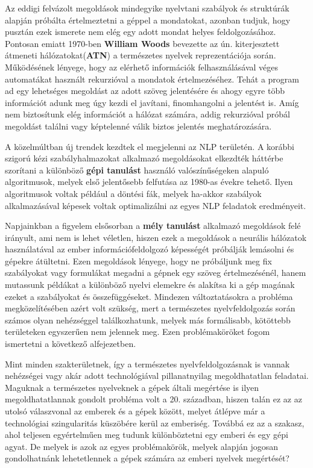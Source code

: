 Az eddigi felvázolt megoldások mindegyike nyelvtani szabályok és struktúrák alapján próbálta értelmeztetni a géppel a mondatokat, azonban tudjuk, hogy pusztán ezek ismerete nem elég egy adott mondat helyes feldolgozásához. Pontosan emiatt 1970-ben \textbf{William Woods} bevezette az ún. kiterjesztett átmeneti hálózatokat(\textbf{ATN}) a természetes nyelvek reprezentációja során. Működésének lényege, hogy az elérhető információk felhasználásával véges automatákat használt rekurzióval a mondatok értelmezéséhez. Tehát a program ad egy lehetséges megoldást az adott szöveg jelentésére és ahogy egyre több információt adunk meg úgy kezdi el javítani, finomhangolni a jelentést is. Amíg nem biztosítunk elég információt a hálózat számára, addig rekurzióval próbál megoldást találni vagy képtelenné válik biztos jelentés meghatározására.

A közelmúltban új trendek kezdtek el megjelenni az NLP területén. A korábbi szigorú kézi szabályhalmazokat alkalmazó megoldásokat elkezdték háttérbe szorítani a különböző \textbf{gépi tanulást} használó valószínűségeken alapuló algoritmusok, melyek első jelentősebb felfutása az 1980-as évekre tehető. Ilyen algoritmusok voltak például a döntési fák, melyek ha-akkor szabályok alkalmazásával képesek voltak optimalizálni az egyes NLP feladatok eredményeit.

Napjainkban a figyelem elsősorban a \textbf{mély tanulást} alkalmazó megoldások felé irányult, ami nem is lehet véletlen, hiszen ezek a megoldások a neurális hálózatok használatával az ember információfeldolgozó képességét próbálják lemásolni és gépekre átültetni. Ezen megoldások lényege, hogy ne próbáljunk meg fix szabályokat vagy formulákat megadni a gépnek egy szöveg értelmezésénél, hanem mutassunk példákat a különböző nyelvi elemekre és alakítsa ki a gép magának ezeket a szabályokat és összefüggéseket. Mindezen változtatásokra a probléma megközelítésében azért volt szükség, mert a természetes nyelvfeldolgozás során számos olyan nehézséggel találkozhatunk, melyek más formálisabb, kötöttebb területeken egyszerűen nem jelennek meg. Ezen problémaköröket fogom ismertetni a következő alfejezetben.


Mint minden szakterületnek, így a természetes nyelvfeldolgozásnak is vannak nehézségei vagy akár adott technológiával pillanatnyilag megoldhatatlan feladatai. Maguknak a természetes nyelveknek a gépek általi megértése is ilyen megoldhatatlannak gondolt probléma volt a 20. században, hiszen talán ez az az utolsó válaszvonal az emberek és a gépek között, melyet átlépve már a technológiai szingularitás küszöbére kerül az emberiség. Továbbá ez az a szakasz, ahol teljesen egyértelműen meg tudunk különböztetni egy emberi és egy gépi agyat. De melyek is azok az egyes problémakörök, melyek alapján jogosan gondolhatnánk lehetetlennek a gépek számára az emberi nyelvek megértését?

